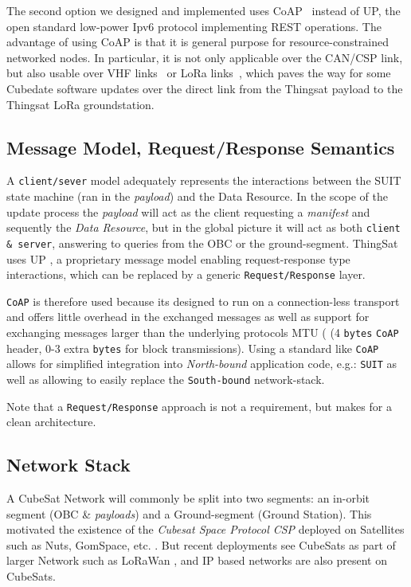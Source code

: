 The second option we designed and implemented uses CoAP~\cite{rfc7252} instead of UP, the open standard low-power Ipv6 protocol implementing REST operations.
The advantage of using CoAP is that it is general purpose for resource-constrained networked nodes. In particular, it is not only applicable over the CAN/CSP link, but also usable over VHF links~\cite{palma2018vhf-coap} or LoRa links~\cite{sanchez2018lora-coap}, which paves the way for some Cubedate software updates over the direct link from the Thingsat payload to the Thingsat LoRa groundstation.



\iffalse

\subsection{Message Model, Request/Response Semantics}

A \texttt{client/sever} model adequately represents the interactions between the SUIT state
machine (ran in the \textit{payload}) and the Data Resource. In the scope of the
update process the \textit{payload} will act as the client requesting a \textit{manifest}
and sequently the \textit{Data Resource}, but in the global picture it will act
as both \texttt{client \& server}, answering to queries from the OBC or the
ground-segment. ThingSat uses UP , a proprietary message
model enabling request-response type interactions, which can be replaced by a
generic \texttt{Request/Response} layer.

\texttt{CoAP} is therefore used because its designed to run on a connection-less transport
and offers little overhead in the exchanged messages as well as support for exchanging
messages larger than the underlying protocols MTU (
(4 \texttt{bytes} \texttt{CoAP} header, 0-3 extra \texttt{bytes} for block transmissions).
Using a standard like \texttt{CoAP} allows for simplified integration into \textit{North-bound}
application code, e.g.: \texttt{SUIT} as well as allowing to easily replace the
\texttt{South-bound} network-stack.

Note that a \texttt{Request/Response} approach is not a requirement, but makes
for a clean architecture.

\subsection{Network Stack}

A CubeSat Network will commonly be split into two segments: an in-orbit segment
(OBC \& \textit{payloads}) and a Ground-segment (Ground Station). This motivated
the existence of the \textit{Cubesat Space Protocol CSP} deployed on Satellites
such as Nuts, GomSpace, etc. . But recent deployments see CubeSats
as part of larger Network such as LoRaWan , and IP based
networks are also present on CubeSats.

